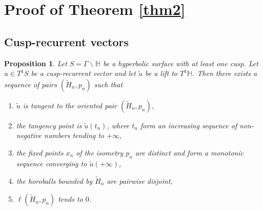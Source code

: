 \documentclass[a4paper,english,reqno]{amsart}
\renewcommand{\H}{\mathbb{H}}
\newtheorem{proposition}{Proposition}
\theoremstyle{definition}
\numberwithin{equation}{section}
\begin{document}


\section{Proof of Theorem \ref{thm2}}

\subsection{Cusp-recurrent vectors}

\begin{proposition}\label{cusprecurrent}
	Let $S= \Gamma \backslash \mathbb{H}$ be a hyperbolic surface with at least one cusp. Let $u\in T^1S$ be a cusp-recurrent vector and let $\tilde u$ be a lift to $T^1 \H$. Then there exists a sequence of pairs $(\tilde H_n, p_n)$ such that
	\begin{enumerate}
		\item $\tilde u$ is tangent to the oriented pair $(\tilde H_n, p_n)$,
		\item the tangency point is $\tilde u(t_n)$, where $t_n$ form an increasing sequence of non-negative numbers tending to $+\infty$,
		\item the fixed points $x_n$ of the isometry $p_n$ are distinct and form a monotonic sequence converging to $\tilde u(+\infty)$,
		\item the horoballs bounded by $\tilde H_n$ are pairwise disjoint,
		\item $\ell(\tilde H_n , p_n)$ tends to $0$.
	\end{enumerate}
\end{proposition}
\end{document}
